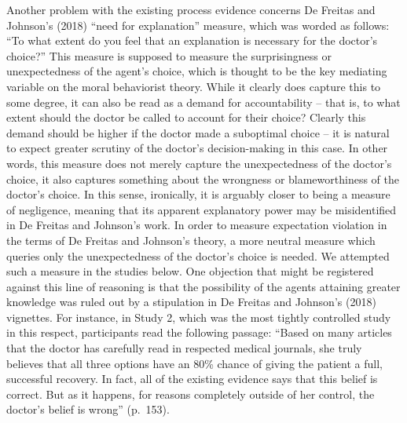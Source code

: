 \documentclass[
  man,floatsintext]{apa6}
\begin{document}
Another problem with the existing process evidence concerns De Freitas and Johnson's (2018) ``need for explanation'' measure, which was worded as follows: ``To what extent do you feel that an explanation is necessary for the doctor's choice?'' This measure is supposed to measure the surprisingness or unexpectedness of the agent's choice, which is thought to be the key mediating variable on the moral behaviorist theory. While it clearly does capture this to some degree, it can also be read as a demand for accountability -- that is, to what extent should the doctor be called to account for their choice? Clearly this demand should be higher if the doctor made a suboptimal choice -- it is natural to expect greater scrutiny of the doctor's decision-making in this case. In other words, this measure does not merely capture the unexpectedness of the doctor's choice, it also captures something about the wrongness or blameworthiness of the doctor's choice. In this sense, ironically, it is arguably closer to being a measure of negligence, meaning that its apparent explanatory power may be misidentified in De Freitas and Johnson's work. In order to measure expectation violation in the terms of De Freitas and Johnson's theory, a more neutral measure which queries only the unexpectedness of the doctor's choice is needed. We attempted such a measure in the studies below. One objection that might be registered against this line of reasoning is that the possibility of the agents attaining greater knowledge was ruled out by a stipulation in De Freitas and Johnson's (2018) vignettes. For instance, in Study 2, which was the most tightly controlled study in this respect, participants read the following passage: ``Based on many articles that the doctor has carefully read in respected medical journals, she truly believes that all three options have an 80\% chance of giving the patient a full, successful recovery. In fact, all of the existing evidence says that this belief is correct. But as it happens, for reasons completely outside of her control, the doctor's belief is wrong'' (p.~153).\\
\end{document}
